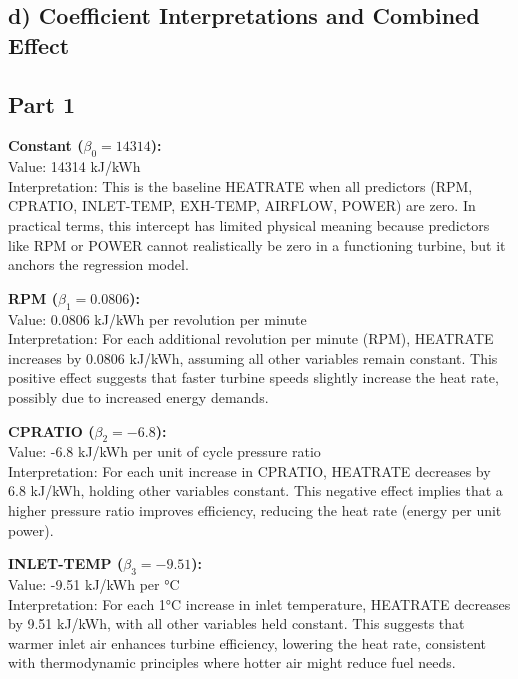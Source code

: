 \documentclass{article}
\begin{document}
\subsection*{d) Coefficient Interpretations and Combined Effect}
\subsection*{Part 1}
\textbf{Constant (\( \beta_0 = 14314 \)):} \\
Value: 14314 kJ/kWh \\
Interpretation: This is the baseline HEATRATE when all predictors (RPM, CPRATIO, INLET-TEMP, EXH-TEMP, AIRFLOW, POWER) are zero. In practical terms, this intercept has limited physical meaning because predictors like RPM or POWER cannot realistically be zero in a functioning turbine, but it anchors the regression model.

\textbf{RPM (\( \beta_1 = 0.0806 \)):} \\
Value: 0.0806 kJ/kWh per revolution per minute \\
Interpretation: For each additional revolution per minute (RPM), HEATRATE increases by 0.0806 kJ/kWh, assuming all other variables remain constant. This positive effect suggests that faster turbine speeds slightly increase the heat rate, possibly due to increased energy demands.

\textbf{CPRATIO (\( \beta_2 = -6.8 \)):} \\
Value: -6.8 kJ/kWh per unit of cycle pressure ratio \\
Interpretation: For each unit increase in CPRATIO, HEATRATE decreases by 6.8 kJ/kWh, holding other variables constant. This negative effect implies that a higher pressure ratio improves efficiency, reducing the heat rate (energy per unit power).

\textbf{INLET-TEMP (\( \beta_3 = -9.51 \)):} \\
Value: -9.51 kJ/kWh per °C \\
Interpretation: For each 1°C increase in inlet temperature, HEATRATE decreases by 9.51 kJ/kWh, with all other variables held constant. This suggests that warmer inlet air enhances turbine efficiency, lowering the heat rate, consistent with thermodynamic principles where hotter air might reduce fuel needs.
\end{document}
